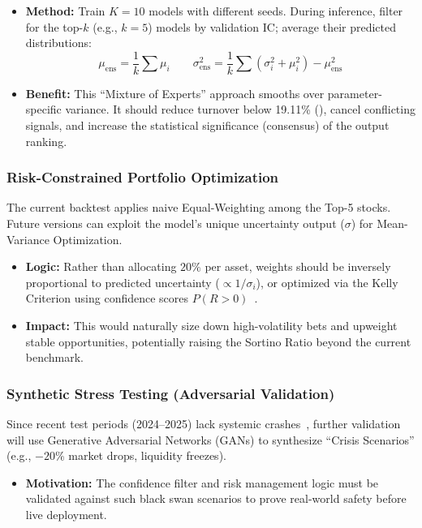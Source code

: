 \documentclass[twoside,final]{hcmut-report}
\newcommand{\result}[1]{\fcolorbox{red}{white}{#1}}
\begin{document}
\begin{itemize}
  \item \textbf{Method:} Train $K=10$ models with different seeds. During inference, filter for the top-$k$ (e.g., $k=5$) models by validation IC; average their predicted distributions:
        \[
          \mu_{\text{ens}} = \frac{1}{k} \sum \mu_i \qquad
          \sigma_{\text{ens}}^2 = \frac{1}{k}\sum(\sigma_i^2 + \mu_i^2) - \mu_{\text{ens}}^2
        \]
  \item \textbf{Benefit:} This ``Mixture of Experts'' approach smooths over parameter-specific variance. It should reduce turnover below 19.11\% (\result{\ref{tab:backtest_metrics}}), cancel conflicting signals, and increase the statistical significance (consensus) of the output ranking.
\end{itemize}

\subsubsection{Risk-Constrained Portfolio Optimization}
The current backtest applies naive Equal-Weighting among the Top-5 stocks. Future versions can exploit the model's unique uncertainty output ($\sigma$) for Mean-Variance Optimization.

\begin{itemize}
  \item \textbf{Logic:} Rather than allocating $20\%$ per asset, weights should be inversely proportional to predicted uncertainty ($\propto 1/\sigma_i$), or optimized via the Kelly Criterion using confidence scores $P(R>0)$~\cite{rvrae2024}.
  \item \textbf{Impact:} This would naturally size down high-volatility bets and upweight stable opportunities, potentially raising the Sortino Ratio beyond the current benchmark.
\end{itemize}

\subsubsection{Synthetic Stress Testing (Adversarial Validation)}
Since recent test periods (2024--2025) lack systemic crashes~\cite{sgp_lstm2024}, further validation will use Generative Adversarial Networks (GANs) to synthesize ``Crisis Scenarios'' (e.g., $-20\%$ market drops, liquidity freezes).

\begin{itemize}
  \item \textbf{Motivation:} The confidence filter and risk management logic must be validated against such black swan scenarios to prove real-world safety before live deployment.
\end{itemize}
\end{document}
